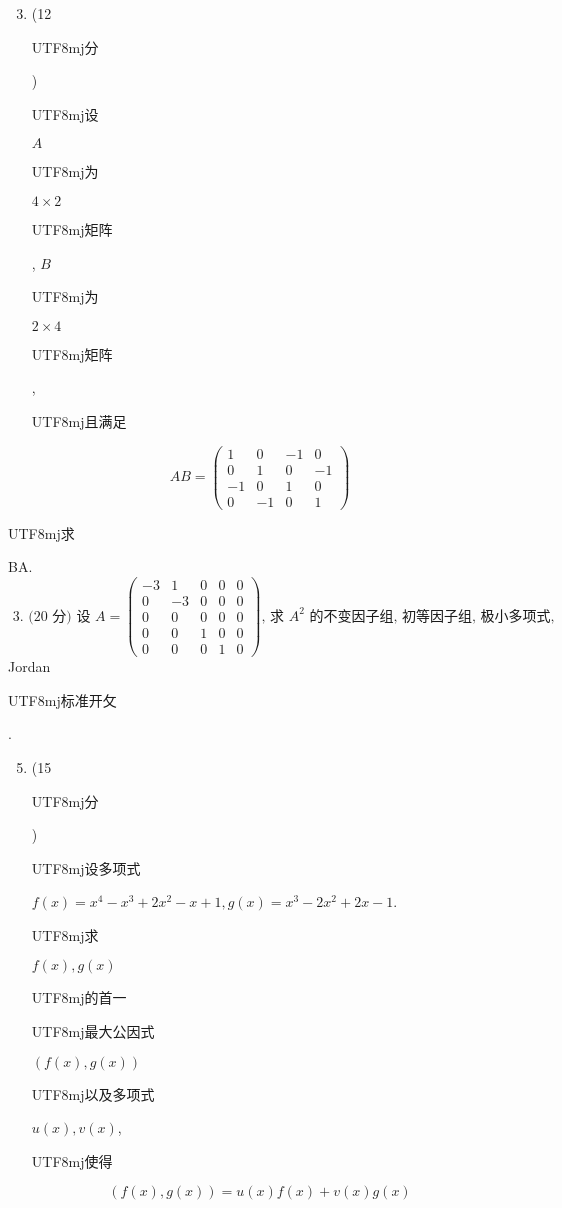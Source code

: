 \documentclass[10pt]{article}
\begin{document}
\begin{enumerate}
  \setcounter{enumi}{2}
  \item (12 \begin{CJK}{UTF8}{mj}分\end{CJK}) \begin{CJK}{UTF8}{mj}设\end{CJK} $A$ \begin{CJK}{UTF8}{mj}为\end{CJK} $4 \times 2$ \begin{CJK}{UTF8}{mj}矩阵\end{CJK}, $B$ \begin{CJK}{UTF8}{mj}为\end{CJK} $2 \times 4$ \begin{CJK}{UTF8}{mj}矩阵\end{CJK}, \begin{CJK}{UTF8}{mj}且满足\end{CJK}
\end{enumerate}
$$
A B=\left(\begin{array}{cccc}
1 & 0 & -1 & 0 \\
0 & 1 & 0 & -1 \\
-1 & 0 & 1 & 0 \\
0 & -1 & 0 & 1
\end{array}\right)
$$
\begin{CJK}{UTF8}{mj}求\end{CJK} BA.
$$
\text { 3. (20 分) 设 } A=\left(\begin{array}{ccccc}
-3 & 1 & 0 & 0 & 0 \\
0 & -3 & 0 & 0 & 0 \\
0 & 0 & 0 & 0 & 0 \\
0 & 0 & 1 & 0 & 0 \\
0 & 0 & 0 & 1 & 0
\end{array}\right) \text {, 求 } A^{2} \text { 的不变因子组, 初等因子组, 极小多项式, }
$$
Jordan \begin{CJK}{UTF8}{mj}标准开攵\end{CJK}.

\begin{enumerate}
  \setcounter{enumi}{4}
  \item (15 \begin{CJK}{UTF8}{mj}分\end{CJK}) \begin{CJK}{UTF8}{mj}设多项式\end{CJK} $f(x)=x^{4}-x^{3}+2 x^{2}-x+1, g(x)=x^{3}-2 x^{2}+2 x-1$. \begin{CJK}{UTF8}{mj}求\end{CJK} $f(x), g(x)$ \begin{CJK}{UTF8}{mj}的首一\end{CJK} \begin{CJK}{UTF8}{mj}最大公因式\end{CJK} $(f(x), g(x))$ \begin{CJK}{UTF8}{mj}以及多项式\end{CJK} $u(x), v(x)$, \begin{CJK}{UTF8}{mj}使得\end{CJK}
\end{enumerate}
$$
(f(x), g(x))=u(x) f(x)+v(x) g(x)
$$
\end{document}
